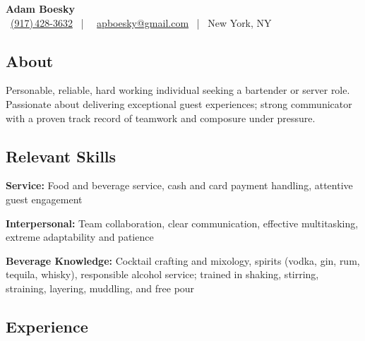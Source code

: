 \documentclass[11pt,letterpaper]{article}
\begin{document}
\thispagestyle{empty}\sloppy\sloppypar\raggedbottom

\begin{center}
    {\huge \textbf{Adam Boesky}}\\[0.2em]
    {\small
        \faPhoneSquare \ \href{tel:+1-917-428-3632}{(917)\,428-3632}
        \ | \
        \faEnvelope \ \href{mailto:apboesky@gmail.com}{apboesky@gmail.com}
        \ | \
        New York, NY
    }
\end{center}

\vspace{-8pt}

\subsection{About}
Personable, reliable, hard working individual seeking a bartender or server role. Passionate about delivering exceptional guest experiences; strong communicator with a proven track record of teamwork and composure under pressure.

\subsection{Relevant Skills}

\begin{list}{}{\cvlist}
    \item \textbf{Service:} Food and beverage service, cash and card payment handling, attentive guest engagement
    \item \textbf{Interpersonal:} Team collaboration, clear communication, effective multitasking, extreme adaptability and patience
    \item \textbf{Beverage Knowledge:} Cocktail crafting and mixology, spirits (vodka, gin, rum, tequila, whisky), responsible alcohol service; trained in shaking, stirring, straining, layering, muddling, and free pour
\end{list}

\subsection{Experience}
\end{document}
